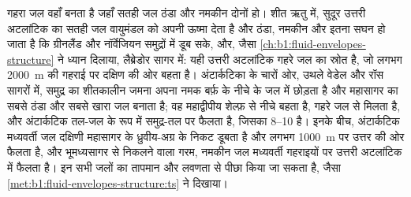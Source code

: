 गहरा जल वहाँ बनता है जहाँ सतही जल ठंडा और नमकीन दोनों हो। शीत ऋतु में, सुदूर उत्तरी अटलांटिक का सतही जल वायुमंडल को अपनी ऊष्मा देता है और ठंडा, नमकीन और इतना सघन हो जाता है कि ग्रीनलैंड और नॉर्वेजियन समुद्रों में डूब सके, और, जैसा \cref{ch:b1:fluid-envelopes-structure} ने ध्यान दिलाया, लैब्रेडोर सागर में: यही उत्तरी अटलांटिक गहरे जल का स्रोत है, जो लगभग \qty{2000}{m} की गहराई पर दक्षिण की ओर बहता है। अंटार्कटिका के चारों ओर, उथले वेडेल और रॉस सागरों में, समुद्र का शीतकालीन जमना अपना नमक बर्फ़ के नीचे के जल में छोड़ता है और महासागर का सबसे ठंडा और सबसे खारा जल बनाता है; वह महाद्वीपीय शेल्फ़ से नीचे बहता है, गहरे जल से मिलता है, और अंटार्कटिक तल-जल के रूप में समुद्र-तल पर फैलता है, जिसका \qtyrange{8}{10}{\sverdrup} है। इनके बीच, अंटार्कटिक मध्यवर्ती जल दक्षिणी महासागर के ध्रुवीय-अग्र के निकट डूबता है और लगभग \qty{1000}{m} पर उत्तर की ओर फैलता है, और भूमध्यसागर से निकलने वाला गरम, नमकीन जल मध्यवर्ती गहराइयों पर उत्तरी अटलांटिक में फैलता है। इन सभी जलों का तापमान और लवणता से पीछा किया जा सकता है, जैसा \cref{met:b1:fluid-envelopes-structure:ts} ने दिखाया।

